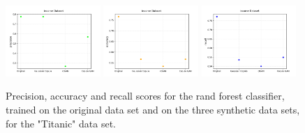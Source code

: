 \documentclass{article}
\begin{document}
\begin{figure}[h!]
	\centering
	\includegraphics[width=0.32\textwidth]{../plots/results/income_precision.png}
	\includegraphics[width=0.32\textwidth]{../plots/results/income_accuracy.png}
	\includegraphics[width=0.32\textwidth]{../plots/results/income_recall.png}
	
	\caption{Precision, accuracy and recall scores for the rand forest classifier, trained on the original data set and on the three synthetic data sets, for the "Titanic" data set.}
	\label{scores_income}
\end{figure}
\end{document}
